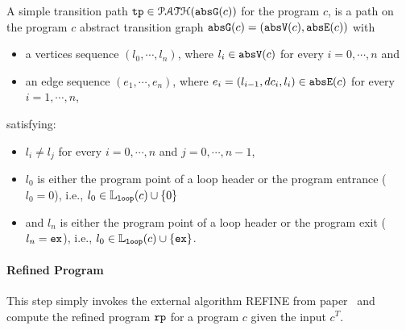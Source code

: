   \begin{defn}
    \label{def:tpath}
  A simple transition path
  $\mathtt{tp} \in \mathcal{PATH}(\mathtt{abs}{\mathtt{G}}(c))$ for the program $c$, is a path on the program $c$ abstract transition graph $\mathtt{abs}{\mathtt{G}}(c) = (\mathtt{abs}{\mathtt{V}}(c), \mathtt{abs}{\mathtt{E}}(c))$ with 
  \begin{itemize}
  \item a vertices sequence $(l_0, \cdots, l_n)$, where $l_i \in \mathtt{abs}{\mathtt{V}}(c)$ for every $i = 0, \cdots, n$ and
  \item an edge sequence $(e_1, \cdots, e_n)$, where $e_i = (l_{i - 1}, dc_i, l_{i}) \in \mathtt{abs}{\mathtt{E}}(c)$ for every $i = 1, \cdots, n$,
  \end{itemize}
  satisfying:
  \begin{itemize}
    \item $l_i \neq l_j$ for every $i = 0, \cdots, n$ and $j = 0, \cdots, {n - 1}$,
    \item $l_0$ is either the program point of a loop header or the program entrance ($l_0 = 0$),
    i.e., $l_0 \in \mathbb{L}_{\mathtt{loop}}(c) \cup \{ 0 \}$
    \item and $l_n$ is either the program point of a loop header or the program exit ($l_n = \mathtt{ex}$),
    i.e., $l_0 \in \mathbb{L}_{\mathtt{loop}}(c) \cup \{ \mathtt{ex} \}$.
  \end{itemize}
  \end{defn}

\paragraph{Refined Program}
This step simply invokes the external algorithm REFINE from paper~\cite{GulwaniJK09} and compute the 
refined program $\mathtt{rp}$ for a program $c$ given the input $c^{T}$.
